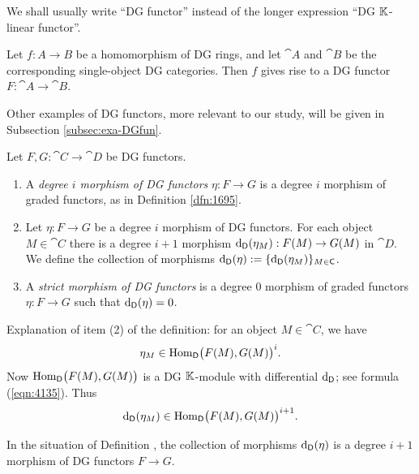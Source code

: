 \begin{conv} \label{conv:4628}
We shall usually write ``DG functor'' instead of the longer expression
``DG $\mathbb{K}$-linear functor''. 
\end{conv}

\begin{exa} \label{exa:1250}
Let $f : A \to B$ be a homomorphism of DG rings, and let 
$\cat{A}$ and $\cat{B}$ be the corresponding single-object DG  
categories. Then $f$ gives rise to a DG functor 
$F : \cat{A} \to \cat{B}$.
\end{exa}

Other examples of DG functors, more relevant to our study, will be given 
in Subsection \ref{subsec:exa-DGfun}. 

\begin{dfn} \label{dfn:1195}
Let $F, G : \cat{C} \to \cat{D}$ be DG functors.
\begin{enumerate}
\item A {\em degree $i$ morphism of DG functors}%
$\eta : F \to G$ is a 
degree $i$ morphism of graded functors, as in Definition \ref{dfn:1695}.

\item Let $\eta : F \to G$ be a degree $i$ morphism of DG functors.
For each object $M \in \cat{C}$ there is a degree $i + 1$ morphism 
$\mathrm{d}_{\operatorname{\mathsf{D}}}(\eta_M) : F(M) \to G(M)$
in $\cat{D}$. 
We define the collection of morphisms  
$\mathrm{d}_{\operatorname{\mathsf{D}}}(\eta) := 
\{ \mathrm{d}_{\operatorname{\mathsf{D}}}(\eta_M) \}_{M \in \operatorname{\mathsf{C}}}$.

\item A {\em strict morphism of DG functors}
is a degree $0$ morphism of graded functors  
$\eta : F \to G$ such that $\mathrm{d}_{\operatorname{\mathsf{D}}}(\eta) = 0$. 
\end{enumerate}
\end{dfn}

Explanation of item (2) of the definition: for an object $M \in \cat{C}$, we 
have
\[ \eta_M \in \operatorname{Hom}_{\operatorname{\mathsf{D}}} \bigl( F(M), G(M) \bigr)^i . \]
Now $\operatorname{Hom}_{\operatorname{\mathsf{D}}} \bigl( F(M), G(M) \bigr)$
is a DG $\mathbb{K}$-module with differential $\mathrm{d}_{\operatorname{\mathsf{D}}}$; see 
formula (\ref{eqn:4135}). Thus 
\[ \mathrm{d}_{\operatorname{\mathsf{D}}}(\eta_M) \in 
\operatorname{Hom}_{\operatorname{\mathsf{D}}} \bigl( F(M), G(M) \bigr)^{i + 1} . \]

\begin{prop} \label{prop:1295}
In the situation of Definition \tup{\ref{dfn:1195}}, the collection of 
morphisms $\mathrm{d}_{\operatorname{\mathsf{D}}}(\eta)$  is a degree $i + 1$ morphism of DG 
functors $F \to G$. 
\end{prop}

